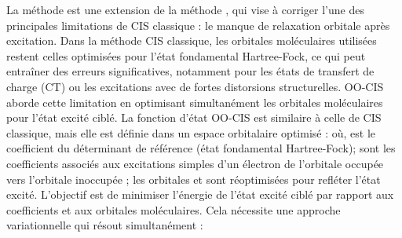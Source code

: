 \markdownRendererOlEndTight \markdownRendererParagraphSeparator
{}
\markdownRendererSectionEnd \markdownRendererSectionBegin
{}\markdownRendererInterblockSeparator
{}La méthode  est une extension de la méthode , qui vise à corriger l'une des principales limitations de CIS classique : le manque de relaxation orbitale après excitation. Dans la méthode CIS classique, les orbitales moléculaires utilisées restent celles optimisées pour l'état fondamental Hartree-Fock, ce qui peut entraîner des erreurs significatives, notamment pour les états de transfert de charge (CT) ou les excitations avec de fortes distorsions structurelles.\markdownRendererParagraphSeparator
{}OO-CIS aborde cette limitation en optimisant simultanément les orbitales moléculaires pour l’état excité ciblé.\markdownRendererInterblockSeparator
{}\markdownRendererSectionBegin
{}\markdownRendererInterblockSeparator
{}La fonction d'état OO-CIS est similaire à celle de CIS classique, mais elle est définie dans un espace orbitalaire optimisé :\markdownRendererInterblockSeparator
{}\markdownRendererInterblockSeparator
{}où,\markdownRendererInterblockSeparator
{}\markdownRendererUlBeginTight
\markdownRendererUlItem {} est le coefficient du déterminant de référence (état fondamental Hartree-Fock);\markdownRendererUlItemEnd 
\markdownRendererUlItem {} sont les coefficients associés aux excitations simples d'un électron de l'orbitale occupée  vers l'orbitale inoccupée ;\markdownRendererUlItemEnd 
\markdownRendererUlItem les orbitales \markdownRendererInlineMath{|\psi_0\rangle} et  sont réoptimisées pour refléter l'état excité.\markdownRendererUlItemEnd 
\markdownRendererUlEndTight \markdownRendererInterblockSeparator
{}
\markdownRendererSectionEnd \markdownRendererSectionBegin
{}\markdownRendererInterblockSeparator
{}L’objectif est de minimiser l'énergie de l'état excité ciblé par rapport aux coefficients  et aux orbitales moléculaires. Cela nécessite une approche variationnelle qui résout simultanément :\markdownRendererInterblockSeparator
